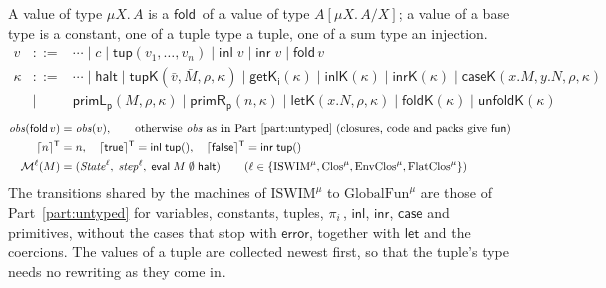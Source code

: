 \documentclass[10pt]{article}
\theoremstyle{acmplain}
\newcommand{\key}[1]{\mathsf{#1}}
\newcommand{\prj}[1]{\pi_{#1}\,}
\newcommand{\ev}[3]{\key{eval}\;#1\;#2\;#3}
\newcommand{\error}{\key{error}}
\newcommand{\Mach}[1]{\mathcal{M}^{#1}}
\newcommand{\step}[1]{\mathit{step}^{#1}}
\newcommand{\obs}{\mathit{obs}}
\newcommand{\tupV}[1]{\key{tup}(#1)}
\newcommand{\inlV}{\key{inl}\;}
\newcommand{\inrV}{\key{inr}\;}
\newcommand{\Kf}[2]{\key{#1}(#2)}
\newcommand{\halt}{\key{halt}}
\newcommand{\Tres}[1]{\lceil #1 \rceil^{\mathsf{T}}}      %
\newcommand{\Ml}[1]{\textrm{#1}^{\mu}}                  %
\newcommand{\Mmu}[2]{\mu #1.\,#2}                         %
\newcommand{\Munroll}[2]{#2[\mu #1.\,#2/#1]}              %
\newcommand{\Mfold}{\key{fold}\,}
\begin{document}
A value of type $\Mmu{X}{A}$ is a $\Mfold$ of a value of type
$\Munroll{X}{A}$; a value of a base type is a constant, one of a tuple type
a tuple, one of a sum type an injection.
\[
\begin{array}{rcl}
  v &::=& \cdots \mid c \mid \tupV{v_1, \ldots, v_n} \mid \inlV v \mid \inrV v \mid \Mfold v \\
  \kappa &::=& \cdots \mid \halt \mid \Kf{tupK}{\bar{v}, \bar{M}, \rho, \kappa} \mid \Kf{getK_i}{\kappa}
    \mid \Kf{inlK}{\kappa} \mid \Kf{inrK}{\kappa} \mid \Kf{caseK}{x.M, y.N, \rho, \kappa} \\
  &\mid& \Kf{primL_p}{M, \rho, \kappa} \mid \Kf{primR_p}{n, \kappa}
    \mid \Kf{letK}{x.N, \rho, \kappa} \mid \Kf{foldK}{\kappa} \mid \Kf{unfoldK}{\kappa}
\end{array}
\]
\begin{align*}
  \obs(\Mfold v) &= \obs(v), \qquad \text{otherwise $\obs$ as in Part~\ref{part:untyped} (closures, code and packs give $\key{fun}$)} \\
  \Tres{n} &= n, \quad
  \Tres{\mathsf{true}} = \inlV \tupV{}, \quad
  \Tres{\mathsf{false}} = \inrV \tupV{} \\
  \Mach{\ell}(M) &= (\mathit{State}^{\ell},\; \step{\ell},\; \ev{M}{\emptyset}{\halt})
    \qquad (\ell \in \{\Ml{ISWIM}, \Ml{Clos}, \Ml{EnvClos}, \Ml{FlatClos}\})
\end{align*}
The transitions shared by the machines of $\Ml{ISWIM}$ to $\Ml{GlobalFun}$ are
those of Part~\ref{part:untyped} for variables, constants, tuples,
$\prj{i}$, $\key{inl}$, $\key{inr}$, $\key{case}$ and primitives, without
the cases that stop with $\error$, together with $\key{let}$ and the
coercions. The values of a tuple are collected newest first, so that the
tuple's type needs no rewriting as they come in.
\end{document}
